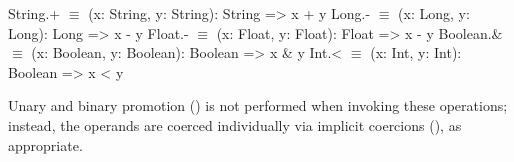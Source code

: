 \begin{xtenmath}
String.+             $\equiv$ (x: String, y: String): String => x + y
Long.-               $\equiv$ (x: Long, y: Long): Long => x - y
Float.-              $\equiv$ (x: Float, y: Float): Float => x - y
Boolean.&            $\equiv$ (x: Boolean, y: Boolean): Boolean => x & y
Int.<                $\equiv$ (x: Int, y: Int): Boolean => x < y
\end{xtenmath}

\begin{xten}
\end{xten}
%



%

Unary and binary promotion () is not performed
when invoking these
operations; instead, the operands are coerced individually via implicit
coercions (), as appropriate.



